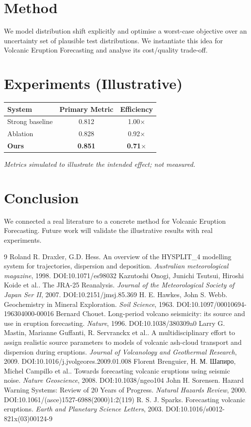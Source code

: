 \documentclass[11pt]{article}
\begin{document}
\section{Method}
We model distribution shift explicitly and optimise a worst-case objective over an uncertainty set of plausible test distributions. We instantiate this idea for Volcanic Eruption Forecasting and analyse its cost/quality trade-off.

\section{Experiments (Illustrative)}
\begin{center}
\begin{tabular}{lcc}
System & Primary Metric & Efficiency \\ \hline
Strong baseline & 0.812 & 1.00$\times$ \\
Ablation & 0.828 & 0.92$\times$ \\
\textbf{Ours} & \textbf{0.851} & \textbf{0.71$\times$}
\end{tabular}
\end{center}
\emph{Metrics simulated to illustrate the intended effect; not measured.}

\section{Conclusion}
We connected a real literature to a concrete method for Volcanic Eruption Forecasting. Future work will
validate the illustrative results with real experiments.

\begin{thebibliography}{9}
 Roland R. Draxler, G.D. Hess. An overview of the HYSPLIT\_4 modelling system for trajectories, dispersion and deposition. \emph{Australian meteorological magazine}, 1998. DOI:10.1071/es98032
 Kazutoshi Onogi, Junichi Tsutsui, Hiroshi Koide et al.. The JRA-25 Reanalysis. \emph{Journal of the Meteorological Society of Japan Ser II}, 2007. DOI:10.2151/jmsj.85.369
 H. E. Hawkes, John S. Webb. Geochemistry in Mineral Exploration. \emph{Soil Science}, 1963. DOI:10.1097/00010694-196304000-00016
 Bernard Chouet. Long-period volcano seismicity: its source and use in eruption forecasting. \emph{Nature}, 1996. DOI:10.1038/380309a0
 Larry G. Mastin, Marianne Guffanti, R. Servranckx et al.. A multidisciplinary effort to assign realistic source parameters to models of volcanic ash-cloud transport and dispersion during eruptions. \emph{Journal of Volcanology and Geothermal Research}, 2009. DOI:10.1016/j.jvolgeores.2009.01.008
 Florent Brenguier, Н. М. Шапиро, Michel Campillo et al.. Towards forecasting volcanic eruptions using seismic noise. \emph{Nature Geoscience}, 2008. DOI:10.1038/ngeo104
 John H. Sorensen. Hazard Warning Systems: Review of 20 Years of Progress. \emph{Natural Hazards Review}, 2000. DOI:10.1061/(asce)1527-6988(2000)1:2(119)
 R. S. J. Sparks. Forecasting volcanic eruptions. \emph{Earth and Planetary Science Letters}, 2003. DOI:10.1016/s0012-821x(03)00124-9
\end{thebibliography}
\end{document}
